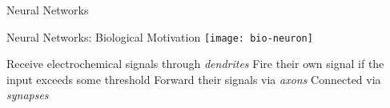 
\begin{frame}
  \centering
  \Huge
  \color{orange}
  \vspace{0.2cm}
  Neural Networks
  \vspace{0.5cm}

\end{frame}

\begin{slide}{Neural Networks: Biological Motivation}
  \centering
  \pause
  \texttt{[image: bio-neuron]}
  \cite{karpathy1}
  \vspace{0.3cm}
  \begin{itemize}
    \pitem Receive electrochemical signals through \emph{dendrites}
    \pitem Fire their own signal if the input exceeds some threshold
    \pitem Forward their signals via \emph{axons}
    \pitem Connected via \emph{synapses}

  \end{itemize}
\end{slide}


